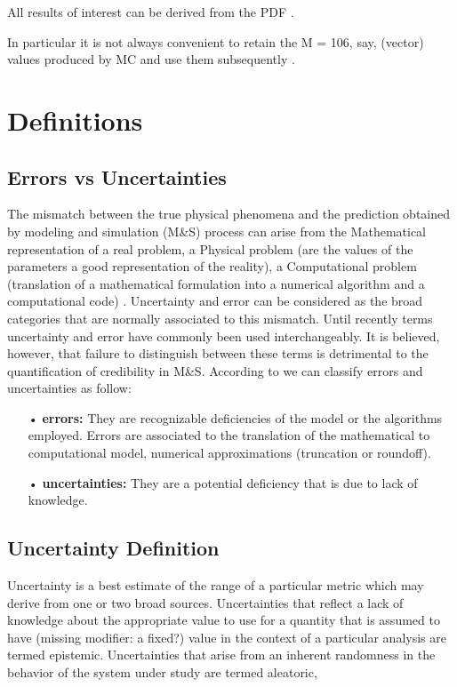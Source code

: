 All results of interest can be derived from the PDF \cite{Cox2012}.

In particular it is not always convenient to retain the M = 106, say, (vector) values produced by MC and use them subsequently \cite{Cox2012}.

\section{Definitions}
\subsection{Errors vs Uncertainties}

The mismatch between the true physical phenomena and the prediction obtained by modeling and simulation (M\&S) process can arise from the Mathematical representation of a real problem, a Physical problem (are the values of the parameters a good representation of the reality), a Computational problem (translation of a mathematical formulation into a numerical algorithm and a computational code) \cite{Thibaut2015}. Uncertainty and error can be considered as the broad categories  that  are  normally  associated to this mismatch. Until recently terms  uncertainty  and error  have  commonly  been  used  interchangeably.  It is believed, however, that failure to distinguish between these terms is detrimental to the quantification of credibility in M\&S. According to \cite{Oberkampf1998} we can classify errors and uncertainties as follow: 

\begin{itemize}
\item[•] \textbf{errors:} They are recognizable deficiencies of the model or the algorithms employed. Errors are associated to the translation of the mathematical to computational model, numerical approximations (truncation or roundoff). 
\item[•] \textbf{uncertainties:} They are a potential deficiency that is due to lack of knowledge.
\end{itemize}

\subsection{Uncertainty Definition}

\begin{defn}
Uncertainty is a best estimate of the range of a particular metric which may derive from one or two broad sources. Uncertainties that reflect a lack of knowledge about the appropriate value to use for a quantity that is assumed to have (missing modifier: a fixed?) value in the context of a particular analysis are termed epistemic. Uncertainties that arise from an inherent randomness in the behavior of the system under study are termed aleatoric, \cite{Helton2009}
\end{defn}

